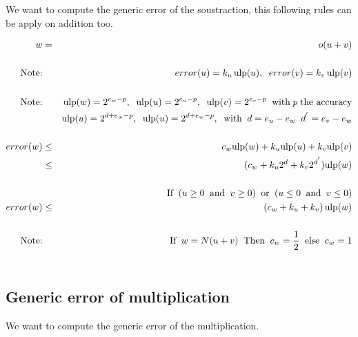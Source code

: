 \documentclass[12pt]{amsart}
\def\ulp{{\rm ulp}}
\begin{document}
We want to compute the generic error of the soustraction, this following rules can be apply on addition too.

\begin{eqnarray}\nonumber
w&=&o(u+v) \\\nonumber
&&\\\nonumber
\textnormal{Note:}&& error(u) = k_u \, \ulp(u), \;\; error(v) = k_v \, \ulp(v)\\\nonumber
&&\\\nonumber
\textnormal{Note:}&& \ulp(w)=2^{e_w-p}, \;\; \ulp(u)=2^{e_u-p},\;\; \ulp(v)=2^{e_v-p}\;\;\textnormal{with} \; p \; \textnormal{the accuracy} \\\nonumber
&& \ulp(u)=2^{d+e_w-p}, \;\; \ulp(u)=2^{d+e_w-p},\;\;\textnormal{with} \;\;d=e_u-e_w \;\; d^{'}=e_v-e_w \\\nonumber
&&\\\nonumber
error(w)& \leq &c_w \ulp(w) + k_u \ulp(u) + k_v \ulp(v) \\\nonumber
&\leq&(c_w+k_u 2^d+ k_v 2^{d^{'}}) \ulp(w)\\\nonumber
&&\\\nonumber
&&\textnormal{If} \;\; ( u \geq 0  \;\;\textnormal{and}\;\;  v \geq 0) \;\;\textnormal{or}\;\; (u \leq 0 \;\;\textnormal{and}\;\; v \leq 0)\\\nonumber
error(w)& \leq&(c_w + k_u + k_v) \, \ulp(w)\\\nonumber
&&\\\nonumber
\textnormal{Note:}&&\textnormal{If}\;\; w=N(u+v) \;\;\textnormal{Then}\;\; c_w =\frac{1}{2} \;\;\textnormal{else}\;\; c_w =1\\\nonumber
\end{eqnarray}

\subsection{Generic error of multiplication}\label{generic:mul}


We want to compute the generic error of the multiplication.
\end{document}
